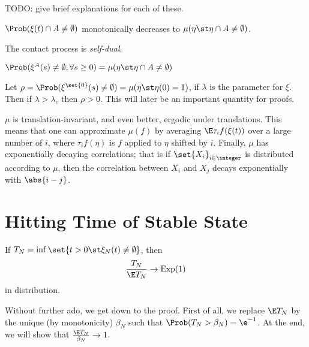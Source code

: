 \documentclass{scrartcl}
\DeclareMathOperator{\expDist}{Exp}
\begin{document}
TODO: give brief explanations for each of these.

\begin{proposition}
  $\Prob(\xi(t) \cap A \neq \emptyset)$ monotonically decreases to $\mu(\eta \st \eta \cap A \neq \emptyset)$.
\end{proposition}

\begin{proposition}
  The contact process is \emph{self-dual}.
\end{proposition}

\begin{corollary}
  $\Prob(\xi^{A}(s) \neq \emptyset, \forall s \geq 0) = \mu(\eta \st \eta \cap A \neq \emptyset)$
\end{corollary}

\begin{proposition}
  Let $\rho = \Prob(\xi^{\set{0}}(s) \neq \emptyset) = \mu(\eta \st \eta(0) = 1)$, if $\lambda$ is the parameter for $\xi$. Then if $\lambda > \lambda_{c}$ then $\rho > 0$. This will later be an important quantity for proofs.
\end{proposition}

\begin{proposition}
  $\mu$ is translation-invariant, and even better, ergodic under translations. This means that one can approximate $\mu(f)$ by averaging $\E \tau_{i}f(\xi(t))$ over a large number of $i$, where $\tau_{i}f(\eta)$ is $f$ applied to $\eta$ shifted by $i$. Finally, $\mu$ has exponentially decaying correlations; that is if $\set{X_{i}}_{i \in \integer}$ is distributed according to $\mu$, then the correlation between $X_{i}$ and $X_{j}$ decays exponentially with $\abs{i - j}$.
\end{proposition}

\section{Hitting Time of Stable State}

\begin{theorem}
  If $T_{N} = \inf\set{t > 0 \st \xi_{N}(t) \neq \emptyset}$, then
  \[ \frac{T_{N}}{\E T_{N}} \to \expDist(1) \]
  in distribution.
\end{theorem}

Without further ado, we get down to the proof. First of all, we replace $\E T_{N}$ by the unique (by monotonicity) $\beta_{N}$ such that $\Prob(T_{N} > \beta_{N}) = \e^{-1}$. At the end, we will show that $\frac{\E T_{N}}{\beta_{N}} \to 1$.
\end{document}
